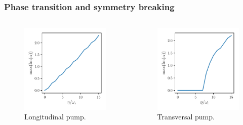 \documentclass[pdflatex,compress]{beamer}
\begin{document}
\begin{frame}
\frametitle{Phase transition and symmetry breaking}
\begin{columns}
\begin{figure}
\centering
\includegraphics[width=1\textwidth]{images/theta_long.pdf}
\vspace*{-10mm}
\caption{Longitudinal pump.}
\end{figure}
\begin{figure}
\centering
\includegraphics[width=1\textwidth]{images/theta_trans.pdf}
\vspace*{-10mm}
\caption{Transversal pump.}
\end{figure}
\end{columns}
\end{frame}
\end{document}
